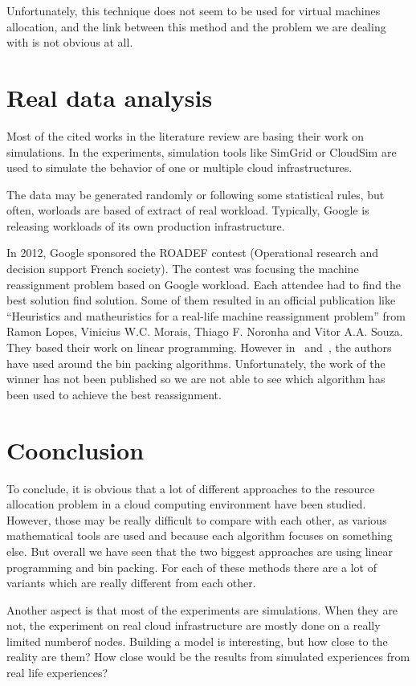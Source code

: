 \documentclass[a4paper,11pt]{article}
\begin{document}
Unfortunately, this technique does not seem to be used for virtual machines
allocation, and the link between this method and the problem we are dealing
with is not obvious at all.

\section{Real data analysis}

Most of the cited works in the literature review are basing their work on
simulations.  In the experiments, simulation tools like
SimGrid\cite{website:simgrid} or CloudSim\cite{website:cloudsim} are used to simulate
the behavior of one or multiple cloud infrastructures.

The data may be generated randomly or following some statistical rules, but
often, worloads are based of extract of real workload. Typically, Google is
releasing workloads of its own production infrastructure. 

In 2012, Google sponsored the ROADEF contest (Operational research and decision
support French society)\cite{website:roadef}. The contest was focusing the machine
reassignment problem based on Google workload. Each attendee had to find the
best solution find solution. Some of them resulted in an official publication
like “Heuristics and matheuristics for a real-life machine reassignment
problem” from Ramon Lopes, Vinicius W.C. Morais, Thiago F. Noronha and Vitor
A.A. Souza\cite{roadef:ip}.  They based their work on linear programming.
However in~\cite{roadef:bp1} and~\cite{roadef:bp2}, the authors have used
around the bin packing algorithms. Unfortunately, the work of the winner has
not been published so we are not able to see which algorithm has been used to
achieve the best reassignment.

\section*{Coonclusion}

To conclude, it is obvious that a lot of different approaches to the resource
allocation problem in a cloud computing environment have been studied. However,
those may be really difficult to compare with each other, as various
mathematical tools are used and because each algorithm focuses on something
else. But overall we have seen that the two biggest approaches are using
linear programming and bin packing. For each of these methods there are
a lot of variants which are really different from each other.

Another aspect is that most of the experiments are simulations. When they
are not, the experiment on real cloud infrastructure are mostly done on a
really limited numberof nodes. Building a model is interesting, but how close
to the reality are them? How close would be the results from simulated
experiences from real life experiences?

\nocite{*}


\end{document}

